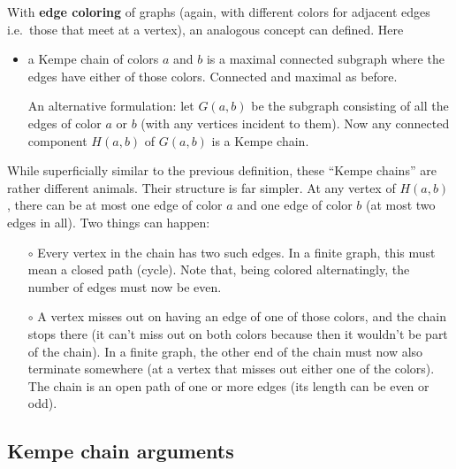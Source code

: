\documentclass[12pt]{article}
\begin{document}
With {\bf edge coloring} of graphs (again, with different colors for adjacent
edges i.e.\ those that meet at a vertex), an analogous concept can defined.
Here
%
\begin{itemize}

\item a Kempe chain of colors $a$ and $b$ is a maximal connected subgraph
where the edges have either of those colors. Connected and maximal as before.

An alternative formulation: let $G(a,b)$ be the subgraph consisting of all the
edges of color $a$ or $b$ (with any vertices incident to them). Now any
connected component $H(a,b)$ of $G(a,b)$ is a Kempe chain.

\end{itemize}
%
While superficially similar to the previous definition, these ``Kempe chains''
are rather different animals. Their structure is far simpler. At any vertex of
$H(a,b)$, there can be at most one edge of color $a$ and one edge of color $b$
(at most two edges in all). Two things can happen:
%
\begin{itemize}

\item[$\circ$] Every vertex in the chain has two such edges. In a finite
     graph, this must mean a closed path (cycle). Note that, being colored
     alternatingly, the number of edges must now be even.

\item[$\circ$] A vertex misses out on having an edge of one of those colors,
     and the chain stops there (it can't miss out on both colors because then
     it wouldn't be part of the chain). In a finite graph, the other end of
     the chain must now also terminate somewhere (at a vertex that misses
     out either one of the colors). The chain is an open path of one or
     more edges (its length can be even or odd).

\end{itemize}

\clearpage
\subsection*{Kempe chain arguments}
\end{document}
